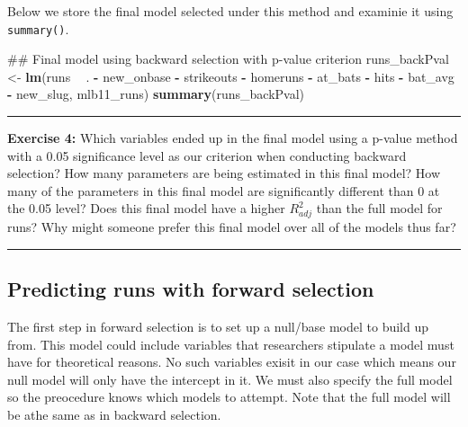 \documentclass[]{book}
\newenvironment{Shaded}{\begin{snugshade}}{\end{snugshade}}
\newcommand{\KeywordTok}[1]{\textcolor[rgb]{0.13,0.29,0.53}{\textbf{#1}}}
\newcommand{\StringTok}[1]{\textcolor[rgb]{0.31,0.60,0.02}{#1}}
\newcommand{\OperatorTok}[1]{\textcolor[rgb]{0.81,0.36,0.00}{\textbf{#1}}}
\newcommand{\NormalTok}[1]{#1}
\theoremstyle{definition}
\theoremstyle{definition}
\theoremstyle{definition}
\theoremstyle{remark}
\begin{document}
Below we store the final model selected under this method and examinie
it using \texttt{summary()}.

\begin{Shaded}
\begin{Highlighting}[]
\NormalTok{## Final model using backward selection with p-value criterion}
\NormalTok{runs_backPval <-}\StringTok{ }\KeywordTok{lm}\NormalTok{(runs }\OperatorTok{~}\StringTok{ }\NormalTok{. }\OperatorTok{-}\StringTok{ }\NormalTok{new_onbase }\OperatorTok{-}\StringTok{ }\NormalTok{strikeouts }\OperatorTok{-}\StringTok{ }\NormalTok{homeruns }\OperatorTok{-}\StringTok{ }\NormalTok{at_bats }\OperatorTok{-}\StringTok{ }\NormalTok{hits  }\OperatorTok{-}\StringTok{ }\NormalTok{bat_avg }\OperatorTok{-}\StringTok{ }\NormalTok{new_slug, mlb11_runs)}
\KeywordTok{summary}\NormalTok{(runs_backPval)}
\end{Highlighting}
\end{Shaded}

\begin{center}\rule{0.5\linewidth}{\linethickness}\end{center}

\textbf{Exercise 4:} Which variables ended up in the final model using a
p-value method with a 0.05 significance level as our criterion when
conducting backward selection? How many parameters are being estimated
in this final model? How many of the parameters in this final model are
significantly different than 0 at the 0.05 level? Does this final model
have a higher \(R^2_{adj}\) than the full model for runs? Why might
someone prefer this final model over all of the models thus far?

\begin{center}\rule{0.5\linewidth}{\linethickness}\end{center}

\subsection{Predicting runs with forward
selection}\label{predicting-runs-with-forward-selection}

The first step in forward selection is to set up a null/base model to
build up from. This model could include variables that researchers
stipulate a model must have for theoretical reasons. No such variables
exisit in our case which means our null model will only have the
intercept in it. We must also specify the full model so the preocedure
knows which models to attempt. Note that the full model will be athe
same as in backward selection.
\end{document}
